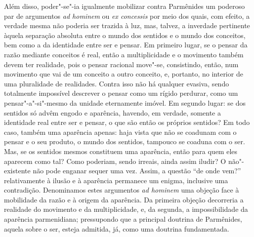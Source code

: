 Além disso, poder"-se"-ia igualmente mobilizar contra Parmênides um poderoso
par de argumentos \textit{ad hominem} ou \textit{ex concessis} por meio dos
quais, com efeito, a verdade mesma não poderia ser trazida à luz, mas,
talvez, a inverdade pertinente àquela separação absoluta entre o mundo dos
sentidos e o mundo dos conceitos, bem como a da identidade entre ser e
pensar. Em primeiro lugar, se o pensar da razão mediante conceitos é real,
então a multiplicidade e o movimento também devem ter realidade, pois o
pensar racional move"-se, consistindo, então, num movimento que vai de um
conceito a outro conceito, e, portanto, no interior de uma pluralidade de
realidades. Contra isso não há qualquer evasiva, sendo totalmente impossível
descrever o pensar como um rígido perdurar, como um pensar"-a"-si"-mesmo da
unidade eternamente imóvel. Em segundo lugar: se dos sentidos só advêm engodo
e aparência, havendo, em verdade, somente a identidade real entre ser e
pensar, o que são então os próprios sentidos? Em todo caso, também uma
aparência apenas: haja vista que não se coadunam com o pensar e o seu
produto, o mundo dos sentidos, tampouco se coaduna com o ser. Mas, se os
sentidos mesmos constituem uma aparência, então para quem eles aparecem como
tal? Como poderiam, sendo irreais, ainda assim iludir? O não"-existente não
pode enganar sequer uma vez. Assim, a questão ``de onde vem?'' relativamente
à ilusão e à aparência permanece um enigma, inclusive uma contradição.
Denominamos estes argumentos \textit{ad hominem} uma objeção face à
mobilidade da razão e à origem da aparência. Da primeira objeção decorreria a
realidade do movimento e da multiplicidade, e, da segunda, a impossibilidade
da aparência parmenidiana; pressupondo que a principal doutrina de
Parmênides, aquela sobre o ser, esteja admitida, já, como uma doutrina
fundamentada.

